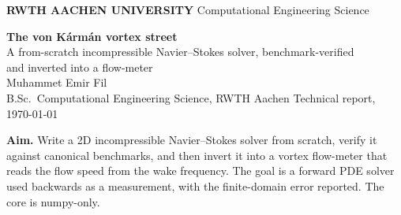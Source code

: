 \documentclass[11pt,a4paper]{article}
\newcommand{\rwthbanner}{%
  \noindent\colorbox{rwthblue}{%
    \parbox{\dimexpr\textwidth-2\fboxsep\relax}{%
      \vspace{2.5pt}%
      {\color{white}\textbf{RWTH AACHEN UNIVERSITY}}\hfill
      {\color{white}\footnotesize Computational Engineering Science}%
      \vspace{2.5pt}}}%
  \vspace{1pt}\par\noindent{\color{rule}\rule{\textwidth}{1.3pt}}%
}
\begin{document}
\rwthbanner
\vspace{0.8em}

{\raggedright
  {\LARGE\bfseries The von K\'arm\'an vortex street}\\[0.35em]
  {\large A from-scratch incompressible Navier--Stokes solver, benchmark-verified\\
   and inverted into a flow-meter}\\[0.8em]
  {\normalsize Muhammet Emir Fil}\\[0.15em]
  {\small B.Sc.\ Computational Engineering Science, RWTH Aachen \quad\textbullet\quad Technical report, \today}\par
}
\vspace{0.6em}
\noindent{\color{rule}\rule{\textwidth}{0.6pt}}
\vspace{1.0em}

\noindent\colorbox{rwthblue25}{%
  \parbox{\dimexpr\textwidth-2\fboxsep\relax}{%
  \vspace{3pt}\textbf{Aim.} Write a 2D incompressible Navier--Stokes solver from scratch, verify
  it against canonical benchmarks, and then invert it into a vortex flow-meter that reads the flow
  speed from the wake frequency. The goal is a forward PDE solver used
  backwards as a measurement, with the finite-domain error reported. The
  core is numpy-only.\vspace{3pt}}}

\vspace{1.0em}

\begin{abstract}
\noindent
A 2D incompressible Navier--Stokes solver is written from scratch in numpy on a staggered (MAC)
grid with Chorin projection, and used to model flow past a cylinder: the steady recirculation
bubble, the von K\'arm\'an vortex street, and vortex-induced vibration (VIV) lock-in of an
elastically mounted cylinder. The solver is verified against four classical benchmarks (Ghia et
al.\ lid-driven cavity; Coutanceau--Bouard wake length; Williamson shedding Strouhal number;
Khalak--Williamson VIV amplitude). It is then inverted: because a bluff body sheds at
$f=\mathrm{St}\,U/D$, the wake frequency reads back the free-stream speed, which makes a vortex
flow-meter, demonstrated as a simulate-then-recover round trip with a Monte-Carlo confidence
interval. Finite-domain blockage shifts the force coefficients above their unbounded references;
the offset is reported rather than tuned away, and cancels in the calibrated inverse.
\end{abstract}
\end{document}
